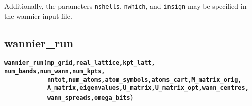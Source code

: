 Additionally, the parameters \verb#nshells#, \verb#nwhich#, and
\verb#insign# may be specified in the wannier input file.

\subsection{wannier\_run} \label{wannier_run}

{\noindent \bf \verb#wannier_run(mp_grid,real_lattice,kpt_latt,#
\verb#num_bands,num_wann,num_kpts,#\\
\verb#            nntot,num_atoms,atom_symbols,atoms_cart,M_matrix_orig,#\\
\verb#            A_matrix,eigenvalues,U_matrix,U_matrix_opt,wann_centres,#\\
\verb#            wann_spreads,omega_bits#)}

